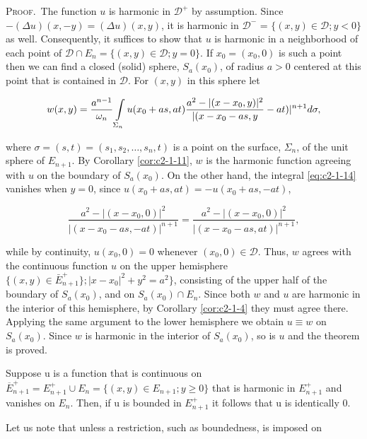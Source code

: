 \textsc{Proof.}\ The function $u$ is harmonic in $\mathcal{D}^+$ by assumption. Since $-(\Delta u)(x, -y) = (\Delta u)(x, y)$, it is harmonic in $\mathcal{D}^-$ = $\{(x, y) \in \mathcal{D}; y < 0\}$ as well. Consequently, it suffices to show that $u$ is harmonic in a neighborhood of each point of $\mathcal{D} \cap E_n = \{(x, y) \in \mathcal{D}; y = 0\}$. If $x_0 = (x_0, 0)$ is such a point then we can find a closed (solid) sphere, $S_a(x_0)$, of radius $a > 0$ centered at this point that is contained in $\mathcal{D}$. For $(x, y)$ in this sphere let

\begin{equation}\label{eq:c2-1-14}
w(x,y)=\frac{a^{n-1}}{\omega_{n}}\intop_{\Sigma_{n}}u(x_{0}+a s,a t)\frac{a^{2}-|(x-x_{0},y)|^{2}}{|(x-x_{0}-a s,y}-a t)|^{n+1}d\sigma,
\end{equation}

where $\sigma = (s, t) = (s_1, s_2, \ldots, s_n, t)$ is a point on the surface, $\Sigma_n$, of the unit sphere of $E_{n+1}$. By Corollary \ref{cor:c2-1-11}, $w$ is the harmonic function agreeing with $u$ on the boundary of $S_a(x_0)$. On the other hand, the integral \eqref{eq:c2-1-14} vanishes when $y = 0$, since $u(x_0 + as, at) = -u(x_0 + as, -at)$,

\[
\frac{a^{2}-|(x-x_{0},0)|^{2}}{|(x-x_{0}-as,-at)|^{n+1}}=\frac{a^{2}-|(x-x_{0},0)|^{2}}{|(x-x_{0}-as,at)|^{n+1}},
\]

while by continuity, $u(x_0,0)=0$ whenever $(x_0,0)\in\mathcal{D}$. Thus, $w$ agrees with the continuous function $u$ on the upper hemisphere $\{(x,y)\in\bar{E}_{n+1}^+\}; |x-x_0|^2+y^2=a^2\}$, consisting of the upper half of the boundary of $S_a(x_0)$, and on $S_a(x_0)\cap E_n$. Since both $w$ and $u$ are harmonic in the interior of this hemisphere, by Corollary \ref{cor:c2-1-4} they must agree there. Applying the same argument to the lower hemisphere we obtain $u\equiv w$ on $S_a(x_0)$. Since $w$ is harmonic in the interior of $S_a(x_0)$, so is $u$ and the theorem is proved.

\begin{corollary}
\label{cor:c2-1-15}
Suppose u is a function that is continuous on $\overline{E}_{n+1}^{+} = E_{n+1}^{+} \cup E_n = \{(x, y) \in E_{n+1}; y \geq 0\}$ that is harmonic in $E_{n+1}^{+}$ and vanishes on $E_n$. Then, if u is bounded in $E_{n+1}^{+}$ it follows that u is identically 0.
\end{corollary}

Let us note that unless a restriction, such as boundedness, is imposed on

